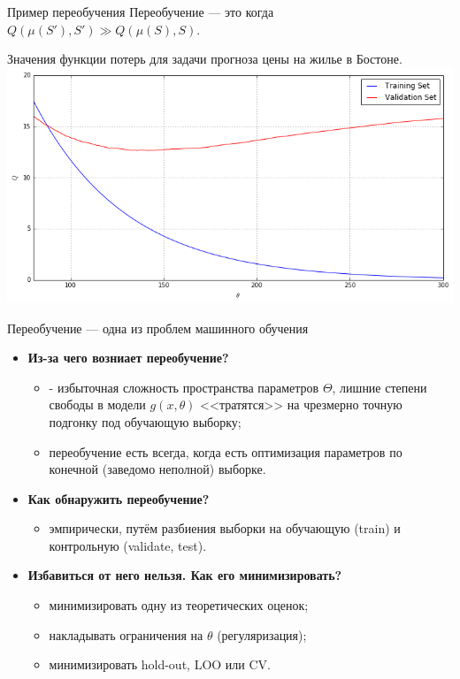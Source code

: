 \documentclass{beamer}
\begin{document}
\begin{frame}{Пример переобучения}
Переобучение --- это когда $Q(\mu(S'), S') \gg Q(\mu(S), S)$.

Значения функции потерь для задачи прогноза цены на жилье в Бостоне.
\includegraphics[width=\linewidth]{fig/overfitting.png}
\end{frame}

\begin{frame}{Переобучение --- одна из проблем машинного обучения}
\begin{itemize}
    \item {\bf Из-за чего возниает переобучение?}
    \begin{itemize}
        \item - избыточная сложность пространства параметров $\Theta$, лишние степени свободы в модели $g(x, \theta)$ <<тратятся>> на чрезмерно точную подгонку под обучающую выборку;
        \item переобучение есть всегда, когда есть оптимизация параметров по конечной (заведомо неполной) выборке.
    \end{itemize}
    \item {\bf Как обнаружить переобучение?}
    \begin{itemize}
        \item эмпирически, путём разбиения выборки на обучающую (train) и контрольную (validate, test).
    \end{itemize}
    \item {\bf Избавиться от него нельзя. Как его минимизировать?}
    \begin{itemize}
        \item минимизировать одну из теоретических оценок;
        \item накладывать ограничения на $\theta$ (регуляризация);
        \item минимизировать hold-out, LOO или CV.
    \end{itemize}
\end{itemize}
\end{frame}
\end{document}
